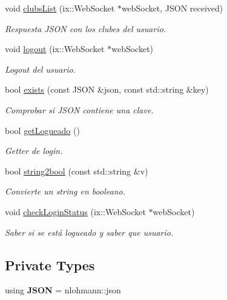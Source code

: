 \begin{DoxyCompactItemize}
void \mbox{\hyperlink{classapp_aacb1fe686708ce187073676232491baf}{clubs\+List}} (ix\+::\+Web\+Socket $\ast$web\+Socket, J\+S\+ON received)
\begin{DoxyCompactList}\small\item\em Respuesta J\+S\+ON con los clubes del usuario. \end{DoxyCompactList}\item 
void \mbox{\hyperlink{classapp_a93176ba428640e16ea767d95319ce0c2}{logout}} (ix\+::\+Web\+Socket $\ast$web\+Socket)
\begin{DoxyCompactList}\small\item\em Logout del usuario. \end{DoxyCompactList}\item 
bool \mbox{\hyperlink{classapp_a42e2a44d3325daf63b3ec57b8921d1b5}{exists}} (const J\+S\+ON \&json, const std\+::string \&key)
\begin{DoxyCompactList}\small\item\em Comprobar si J\+S\+ON contiene una clave. \end{DoxyCompactList}\item 
bool \mbox{\hyperlink{classapp_a9d5d32bf19b4ae0a9c9d7fab8d87ac0f}{get\+Logueado}} ()
\begin{DoxyCompactList}\small\item\em Getter de login. \end{DoxyCompactList}\item 
bool \mbox{\hyperlink{classapp_af87506f90057b288a801f2a0d4c00ef4}{string2bool}} (const std\+::string \&v)
\begin{DoxyCompactList}\small\item\em Convierte un string en booleano. \end{DoxyCompactList}\item 
void \mbox{\hyperlink{classapp_a77a1d0cb7a5a4982bcd618a5380e6edf}{check\+Login\+Status}} (ix\+::\+Web\+Socket $\ast$web\+Socket)
\begin{DoxyCompactList}\small\item\em Saber si se está logueado y saber que usuario. \end{DoxyCompactList}\end{DoxyCompactItemize}
\subsection*{Private Types}
\begin{DoxyCompactItemize}
\item 
\mbox{\label{classapp_a28638f5d121e9e12247d69575bda5e6d}} 
using {\bfseries J\+S\+ON} = nlohmann\+::json
\end{DoxyCompactItemize}
